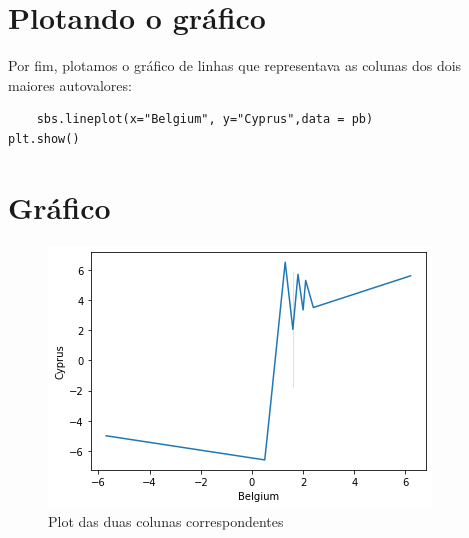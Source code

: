 \documentclass{article}
\begin{document}
\section{Plotando o gráfico}
Por fim, plotamos o gráfico de linhas que representava as colunas dos dois maiores autovalores:
\begin{verbatim}
    sbs.lineplot(x="Belgium", y="Cyprus",data = pb)
plt.show()
\end{verbatim}
\hline
\section{Gráfico}
\begin{figure}
    \centering
    \includegraphics{figs/graphic.png}
    \caption{Plot das duas colunas correspondentes}
    \label{fig:my_label}
\end{figure}
\end{document}
